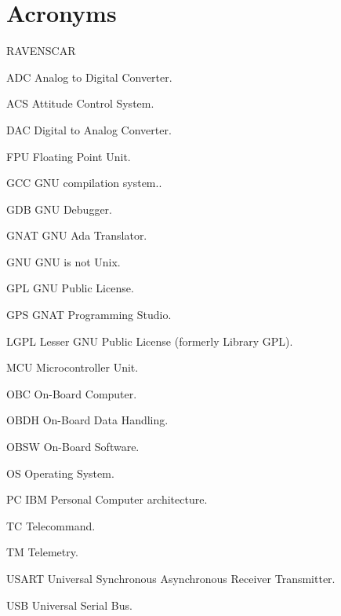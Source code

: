 \section*{Acronyms}

\begin{entry}{RAVENSCAR}
\item[ADC] Analog to Digital Converter.
\item[ACS] Attitude Control System.
\item[DAC] Digital to Analog Converter.
\item[FPU] Floating Point Unit.
\item[GCC] GNU compilation system..
\item[GDB] GNU Debugger.
\item[GNAT] GNU Ada Translator.
\item[GNU] GNU is not Unix.
\item[GPL] GNU Public License.
\item[GPS] GNAT Programming Studio.
\item[LGPL] Lesser GNU Public License (formerly Library GPL).
\item[MCU] Microcontroller Unit.
\item[OBC] On-Board Computer.
\item[OBDH] On-Board Data Handling.
\item[OBSW] On-Board Software.
\item[OS] Operating System.
\item[PC] IBM Personal Computer architecture.
\item[TC] Telecommand.
\item[TM] Telemetry.
\item[USART] Universal Synchronous Asynchronous Receiver Transmitter.
\item[USB] Universal Serial Bus.
\end{entry}

